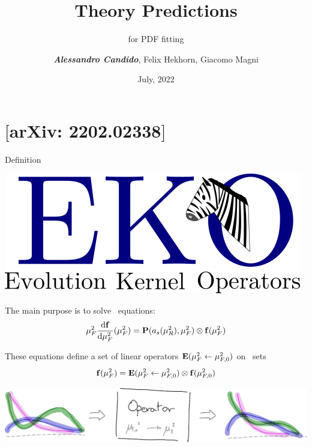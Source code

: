 \documentclass[9pt]{beamer}
\title{Theory Predictions}
\subtitle{for PDF fitting}
\date{July, 2022}
\author{\textit{\textbf{Alessandro Candido}}, Felix Hekhorn, Giacomo Magni}
\providecommand{\iRef}[1]{{\color{mLightGreen}\small $[$#1$]$}}
\begin{document}
\maketitle


\section{\eko{} \iRef{arXiv: 2202.02338}}

\begin{frame}{\eko{} Definition}
	\begin{center}
		\includegraphics[width=.35\linewidth]{eko}
	\end{center}

    The main purpose is to solve \textbf{\dglap}\ equations:
	\begin{equation*}
		\muF^2 \dv{\vb f}{\muF^2}{}(\muF^2) = \vb P (a_s(\muR^2),\muF^2) \otimes \vb f(\muF^2)
	\end{equation*}

    These equations define a set of linear operators $\vb E(\mu_F^2 \leftarrow
    \mu_{F,0}^2)$ on \textbf{\pdf}\ sets
	\begin{equation*}
		\vb f(\mu_F^2) = \vb E(\mu_F^2 \leftarrow \mu_{F,0}^2) \otimes \vb f(\mu_{F,0}^2)
	\end{equation*}

    \vspace*{15pt}
	\begin{center}
		\includegraphics[width=0.7\linewidth]{ev-op}
	\end{center}
\end{frame}
\end{document}
